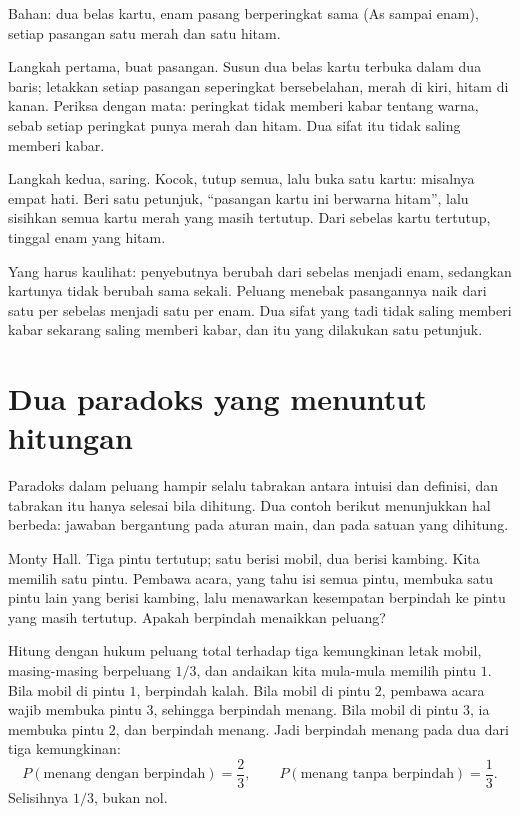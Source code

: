 \begin{tangan}
Bahan: dua belas kartu, enam pasang berperingkat sama (As sampai enam), setiap pasangan
satu merah dan satu hitam.

Langkah pertama, buat pasangan. Susun dua belas kartu terbuka dalam dua baris; letakkan
setiap pasangan seperingkat bersebelahan, merah di kiri, hitam di kanan. Periksa dengan
mata: peringkat tidak memberi kabar tentang warna, sebab setiap peringkat punya merah
dan hitam. Dua sifat itu tidak saling memberi kabar.

Langkah kedua, saring. Kocok, tutup semua, lalu buka satu kartu: misalnya empat hati.
Beri satu petunjuk, ``pasangan kartu ini berwarna hitam'', lalu sisihkan semua kartu
merah yang masih tertutup. Dari sebelas kartu tertutup, tinggal enam yang hitam.

Yang harus kaulihat: penyebutnya berubah dari sebelas menjadi enam, sedangkan kartunya
tidak berubah sama sekali. Peluang menebak pasangannya naik dari satu per sebelas menjadi
satu per enam. Dua sifat yang tadi tidak saling memberi kabar sekarang saling memberi
kabar, dan itu yang dilakukan satu petunjuk.
\end{tangan}

\section{Dua paradoks yang menuntut hitungan}

Paradoks dalam peluang hampir selalu tabrakan antara intuisi dan definisi, dan
tabrakan itu hanya selesai bila dihitung. Dua contoh berikut menunjukkan hal berbeda:
jawaban bergantung pada aturan main, dan pada satuan yang dihitung.


Monty Hall. Tiga pintu tertutup; satu berisi mobil, dua berisi kambing. Kita memilih
satu pintu. Pembawa acara, yang tahu isi semua pintu, membuka satu pintu lain yang
berisi kambing, lalu menawarkan kesempatan berpindah ke pintu yang masih tertutup.
Apakah berpindah menaikkan peluang?

Hitung dengan hukum peluang total terhadap tiga kemungkinan letak mobil, masing-masing
berpeluang $1/3$, dan andaikan kita mula-mula memilih pintu $1$. Bila mobil di pintu
$1$, berpindah kalah. Bila mobil di pintu $2$, pembawa acara wajib membuka pintu $3$,
sehingga berpindah menang. Bila mobil di pintu $3$, ia membuka pintu $2$, dan berpindah
menang. Jadi berpindah menang pada dua dari tiga kemungkinan:
\[
P(\text{menang dengan berpindah})=\frac{2}{3},\qquad
P(\text{menang tanpa berpindah})=\frac{1}{3}.
\]
Selisihnya $1/3$, bukan nol.

